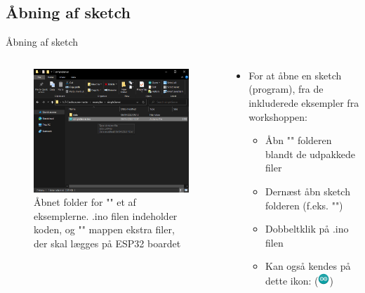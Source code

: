 \documentclass[aspectratio=169]{beamer}
\begin{document}
\subsection{Åbning af sketch}
\begin{frame}{Åbning af sketch}
\begin{columns}

	\begin{column}{0.5\textwidth}
		\begin{figure}
  			\includegraphics[height=0.6\textheight,keepaspectratio=true]{assets/pictures/examplefolder.png}
  			\caption{Åbnet folder for "" et af eksemplerne. .ino filen indeholder koden, og "" mappen ekstra filer, der skal lægges på ESP32 boardet}
  			\label{fig:examplefolder}
		\end{figure}
	\end{column}

	\begin{column}{0.5\textwidth}
		\begin{textBox}
			\begin{itemize}
				\item For at åbne en sketch (program), fra de inkluderede eksempler fra workshoppen:
				\begin{itemize}
					\item Åbn "" folderen blandt de udpakkede filer
					\item Dernæst åbn sketch folderen (f.eks. "")
					\item Dobbeltklik på .ino filen
					\item Kan også kendes på dette ikon: (\includegraphics[height=12pt, keepaspectratio=true]{assets/pictures/arduino-icon.png})
				\end{itemize}
			\end{itemize}
		\end{textBox}
	\end{column}
	
\end{columns}
\end{frame}
\end{document}
